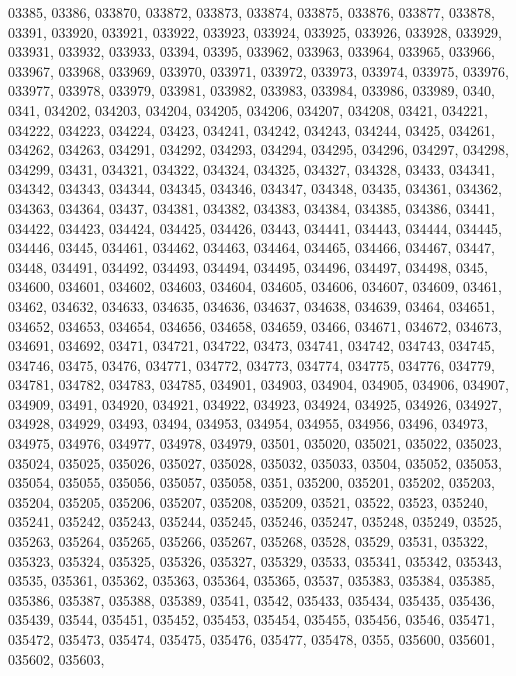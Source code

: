 {03385,
03386,
033870,
033872,
033873,
033874,
033875,
033876,
033877,
033878,
03391,
033920,
033921,
033922,
033923,
033924,
033925,
033926,
033928,
033929,
033931,
033932,
033933,
03394,
03395,
033962,
033963,
033964,
033965,
033966,
033967,
033968,
033969,
033970,
033971,
033972,
033973,
033974,
033975,
033976,
033977,
033978,
033979,
033981,
033982,
033983,
033984,
033986,
033989,
0340,
0341,
034202,
034203,
034204,
034205,
034206,
034207,
034208,
03421,
034221,
034222,
034223,
034224,
03423,
034241,
034242,
034243,
034244,
03425,
034261,
034262,
034263,
034291,
034292,
034293,
034294,
034295,
034296,
034297,
034298,
034299,
03431,
034321,
034322,
034324,
034325,
034327,
034328,
03433,
034341,
034342,
034343,
034344,
034345,
034346,
034347,
034348,
03435,
034361,
034362,
034363,
034364,
03437,
034381,
034382,
034383,
034384,
034385,
034386,
03441,
034422,
034423,
034424,
034425,
034426,
03443,
034441,
034443,
034444,
034445,
034446,
03445,
034461,
034462,
034463,
034464,
034465,
034466,
034467,
03447,
03448,
034491,
034492,
034493,
034494,
034495,
034496,
034497,
034498,
0345,
034600,
034601,
034602,
034603,
034604,
034605,
034606,
034607,
034609,
03461,
03462,
034632,
034633,
034635,
034636,
034637,
034638,
034639,
03464,
034651,
034652,
034653,
034654,
034656,
034658,
034659,
03466,
034671,
034672,
034673,
034691,
034692,
03471,
034721,
034722,
03473,
034741,
034742,
034743,
034745,
034746,
03475,
03476,
034771,
034772,
034773,
034774,
034775,
034776,
034779,
034781,
034782,
034783,
034785,
034901,
034903,
034904,
034905,
034906,
034907,
034909,
03491,
034920,
034921,
034922,
034923,
034924,
034925,
034926,
034927,
034928,
034929,
03493,
03494,
034953,
034954,
034955,
034956,
03496,
034973,
034975,
034976,
034977,
034978,
034979,
03501,
035020,
035021,
035022,
035023,
035024,
035025,
035026,
035027,
035028,
035032,
035033,
03504,
035052,
035053,
035054,
035055,
035056,
035057,
035058,
0351,
035200,
035201,
035202,
035203,
035204,
035205,
035206,
035207,
035208,
035209,
03521,
03522,
03523,
035240,
035241,
035242,
035243,
035244,
035245,
035246,
035247,
035248,
035249,
03525,
035263,
035264,
035265,
035266,
035267,
035268,
03528,
03529,
03531,
035322,
035323,
035324,
035325,
035326,
035327,
035329,
03533,
035341,
035342,
035343,
03535,
035361,
035362,
035363,
035364,
035365,
03537,
035383,
035384,
035385,
035386,
035387,
035388,
035389,
03541,
03542,
035433,
035434,
035435,
035436,
035439,
03544,
035451,
035452,
035453,
035454,
035455,
035456,
03546,
035471,
035472,
035473,
035474,
035475,
035476,
035477,
035478,
0355,
035600,
035601,
035602,
035603,
}
